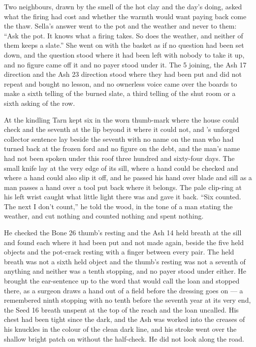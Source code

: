 Two neighbours, drawn by the smell of the hot clay and the day's doing, asked what the firing had cost and whether the warmth would want paying back come the thaw. Sella's answer went to the pot and the weather and never to them: “Ask the pot. It knows what a firing takes. So does the weather, and neither of them keeps a slate.” She went on with the basket as if no question had been set down, and the question stood where it had been left with nobody to take it up, and no figure came off it and no payer stood under it. The  5 joining, the Ash 17 direction and the Ash 23 direction stood where they had been put and did not repeat and bought no lesson, and no ownerless voice came over the boards to make a sixth telling of the burned slate, a third telling of the shut room or a sixth asking of the row.

At the kindling Tarn kept six in the worn thumb-mark where the house could check and the seventh at the lip beyond it where it could not, and 's unforged collector sentence lay beside the seventh with no name on the man who had turned back at the frozen ford and no figure on the debt, and the man's name had not been spoken under this roof three hundred and sixty-four days. The small knife lay at the very edge of its sill, where a hand could be checked and where a hand could also slip it off, and he passed his hand over blade and sill as a man passes a hand over a tool put back where it belongs. The pale clip-ring at his left wrist caught what little light there was and gave it back. “Six counted. The next I don't count,” he told the wood, in the tone of a man stating the weather, and cut nothing and counted nothing and spent nothing.

He checked the Bone 26 thumb's resting and the Ash 14 held breath at the sill and found each where it had been put and not made again, beside the five held objects and the pot-crack resting with a finger between every pair. The held breath was not a sixth held object and the thumb's resting was not a seventh of anything and neither was a tenth stopping, and no payer stood under either. He brought the ear-sentence up to the word that would call the loan and stopped there, as a surgeon draws a hand out of a field before the dressing goes on --- a remembered ninth stopping with no tenth before the seventh year at its very end, the Seed 16 breath unspent at the top of the reach and the loan uncalled. His chest had been tight since the dark, and the Ash was worked into the creases of his knuckles in the colour of the clean dark line, and his stroke went over the shallow bright patch on  without the half-check. He did not look along the road.

